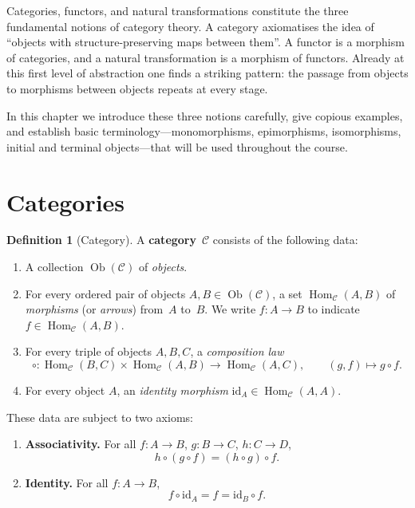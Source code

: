 \documentclass[a4paper,12pt]{book}
\DeclareMathOperator{\Hom}{Hom}
\DeclareMathOperator{\Ob}{Ob}
\newcommand{\id}{\mathrm{id}}
\theoremstyle{definition}
\newtheorem{definition}{Definition}[section]
\theoremstyle{plain}
\theoremstyle{remark}
\begin{document}
\vspace{1em}

Categories, functors, and natural transformations constitute the three
fundamental notions of category theory.  A category axiomatises the idea
of ``objects with structure-preserving maps between them''.  A functor is
a morphism of categories, and a natural transformation is a morphism of
functors.  Already at this first level of abstraction one finds a
striking pattern: the passage from objects to morphisms between objects
repeats at every stage.

In this chapter we introduce these three notions carefully, give
copious examples, and establish basic terminology---monomorphisms,
epimorphisms, isomorphisms, initial and terminal objects---that will be
used throughout the course.



\section{Categories}\label{sec:categories}

\begin{definition}[Category]\label{def:category}
A \textbf{category}~$\mathcal{C}$ consists of the following data:
\begin{enumerate}[label=(\roman*)]
    \item A collection $\Ob(\mathcal{C})$ of \emph{objects}.
    \item For every ordered pair of objects $A,B\in\Ob(\mathcal{C})$,
          a set $\Hom_\mathcal{C}(A,B)$ of \emph{morphisms}
          (or \emph{arrows}) from~$A$ to~$B$.
          We write $f\colon A\to B$ to indicate
          $f\in\Hom_\mathcal{C}(A,B)$.
    \item For every triple of objects $A,B,C$, a \emph{composition law}
          \[
              \circ\colon \Hom_\mathcal{C}(B,C)\times
                          \Hom_\mathcal{C}(A,B)
                          \longrightarrow \Hom_\mathcal{C}(A,C),
              \qquad (g,f)\longmapsto g\circ f.
          \]
    \item For every object $A$, an \emph{identity morphism}
          $\id_A\in\Hom_\mathcal{C}(A,A)$.
\end{enumerate}
These data are subject to two axioms:
\begin{enumerate}[label=\textbf{(C\arabic*)}]
    \item \textbf{Associativity.}
          For all $f\colon A\to B$, $g\colon B\to C$,
          $h\colon C\to D$,
          \[
              h\circ(g\circ f) = (h\circ g)\circ f.
          \]
    \item \textbf{Identity.}
          For all $f\colon A\to B$,
          \[
              f\circ\id_A = f = \id_B\circ f.
          \]
\end{enumerate}
\end{definition}
\end{document}
